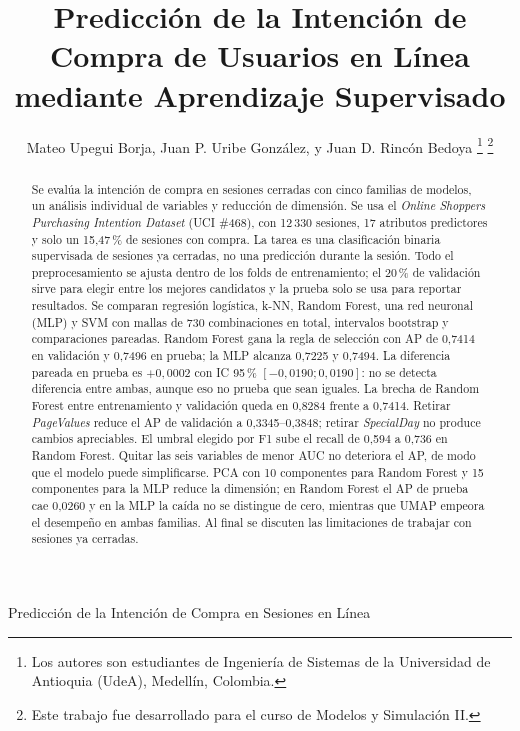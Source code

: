 \documentclass[journal]{IEEEtran}
\begin{document}
\title{Predicción de la Intención de Compra de Usuarios en Línea\\ mediante Aprendizaje Supervisado}

\author{Mateo Upegui Borja, Juan P. Uribe González, y Juan D. Rincón Bedoya%
	\thanks{Los autores son estudiantes de Ingeniería de Sistemas de la Universidad
		de Antioquia (UdeA), Medellín, Colombia.}
	\thanks{Este trabajo fue desarrollado para el curso de Modelos y Simulación II.}}

{Predicción de la Intención de Compra en Sesiones en Línea}

\maketitle

\begin{abstract}
	Se evalúa la intención de compra en sesiones cerradas con cinco familias de modelos,
	un análisis individual de variables y reducción de dimensión. Se usa el
	\textit{Online Shoppers Purchasing Intention Dataset} (UCI \#468), con 12\,330 sesiones,
	17 atributos predictores y solo un 15,47\,\% de sesiones con compra. La tarea es una
	clasificación binaria supervisada de sesiones ya cerradas, no una predicción durante
	la sesión. Todo el preprocesamiento se ajusta dentro de los folds de entrenamiento; el
	20\,\% de validación sirve para elegir entre los mejores candidatos y la prueba solo se usa para reportar resultados. Se comparan
	regresión logística, k-NN, Random Forest, una red neuronal (MLP) y SVM con mallas de
	730 combinaciones en total, intervalos bootstrap y comparaciones pareadas. Random Forest
	gana la regla de selección con AP de 0{,}7414 en validación y 0{,}7496 en prueba; la
	MLP alcanza 0{,}7225 y 0{,}7494. La diferencia pareada en prueba es
	$+0{,}0002$ con IC 95\,\% $[-0{,}0190;0{,}0190]$: no se detecta diferencia entre
	ambas, aunque eso no prueba que sean iguales. La brecha de Random Forest entre
	entrenamiento y validación queda en 0{,}8284 frente a 0{,}7414. Retirar
	\textit{PageValues} reduce el AP de validación a 0{,}3345--0{,}3848; retirar
	\textit{SpecialDay} no produce cambios apreciables. El umbral elegido por F1 sube el
	recall de 0{,}594 a 0{,}736 en Random Forest. Quitar las seis variables de menor AUC
	no deteriora el AP, de modo que el modelo puede simplificarse. PCA con 10 componentes
	para Random Forest y 15 componentes para la MLP reduce la dimensión; en Random Forest el
	AP de prueba cae 0{,}0260 y en la MLP la caída no se distingue de cero, mientras que UMAP
	empeora el desempeño en ambas familias. Al final se discuten las limitaciones de
	trabajar con sesiones ya cerradas.
\end{abstract}
\end{document}
